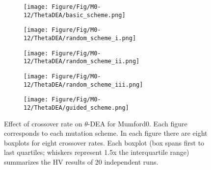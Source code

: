 \begin{figure}[!htbp]
	\centering
	\begin{subfigure}[b]{0.52\textwidth}
		\texttt{[image: Figure/Fig/M0-12/ThetaDEA/basic\_scheme.png]}
	\end{subfigure}%
	\begin{subfigure}[b]{0.52\textwidth}
		\texttt{[image: Figure/Fig/M0-12/ThetaDEA/random\_scheme\_i.png]}
	\end{subfigure}%
	\newline
	\begin{subfigure}[b]{0.52\textwidth}
		\texttt{[image: Figure/Fig/M0-12/ThetaDEA/random\_scheme\_ii.png]}
	\end{subfigure}%
	\begin{subfigure}[b]{0.52\textwidth}
		\texttt{[image: Figure/Fig/M0-12/ThetaDEA/random\_scheme\_iii.png]}
	\end{subfigure}%
	\newline
	\begin{subfigure}[b]{0.52\textwidth}
		\texttt{[image: Figure/Fig/M0-12/ThetaDEA/guided\_scheme.png]}
	\end{subfigure}%
	\caption{Effect of crossover rate on $\theta$-DEA for Mumford0. Each figure corresponds to each mutation scheme. In each figure there are eight boxplots for eight crossover rates.  Each boxplot (box spans first to last quartiles; whiskers represent 1.5x the interquartile range) summarizes the HV results of 20 independent runs.}
	\label{fig:cr_m0_thetadea}
\end{figure}

